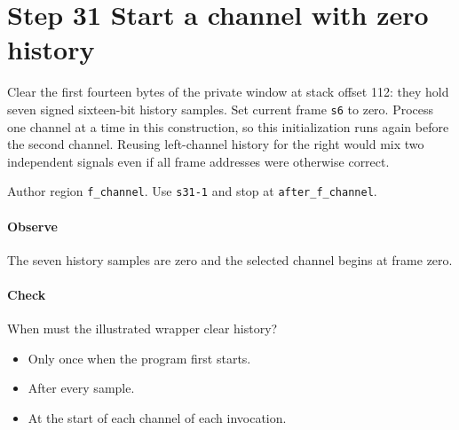\section{Step 31 Start a channel with zero history}\label{pcm-wav-s31}
Clear the first fourteen bytes of the private window at stack offset 112: they hold seven signed sixteen-bit history samples. Set current frame \texttt{s6} to zero. Process one channel at a time in this construction, so this initialization runs again before the second channel. Reusing left-channel history for the right would mix two independent signals even if all frame addresses were otherwise correct.

Author region \texttt{f\_channel}. Use \texttt{s31-1} and stop at \texttt{after\_f\_channel}.

\paragraph{Observe} The seven history samples are zero and the selected channel begins at frame zero.

\paragraph{Check} When must the illustrated wrapper clear history?
\begin{itemize}
  \item[A.] Only once when the program first starts.
  \item[B.] After every sample.
  \item[C.] At the start of each channel of each invocation.
\end{itemize}
